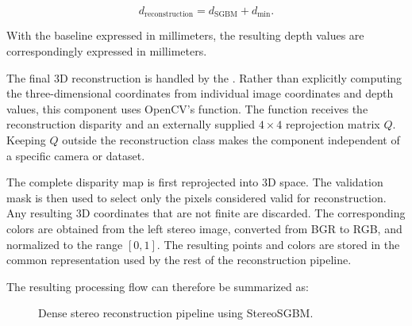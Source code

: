 \begin{equation}
d_{\mathrm{reconstruction}}
=
d_{\mathrm{SGBM}}
+
d_{\min}.
\label{eq:disparity_reconstruction}
\end{equation}

With the baseline expressed in millimeters, the resulting depth values are correspondingly expressed in millimeters.

The final 3D reconstruction is handled by the . Rather than explicitly computing the three-dimensional coordinates from individual image coordinates and depth values, this component uses OpenCV's  function. The function receives the reconstruction disparity and an externally supplied \(4\times4\) reprojection matrix \(Q\). Keeping \(Q\) outside the reconstruction class makes the component independent of a specific camera or dataset.

The complete disparity map is first reprojected into 3D space. The validation mask is then used to select only the pixels considered valid for reconstruction. Any resulting 3D coordinates that are not finite are discarded. The corresponding colors are obtained from the left stereo image, converted from BGR to RGB, and normalized to the range \([0,1]\). The resulting points and colors are stored in the common  representation used by the rest of the reconstruction pipeline.

The resulting processing flow can therefore be summarized as:

\begin{figure}[H]
    \centering
    \caption{Dense stereo reconstruction pipeline using StereoSGBM.}
    \label{fig:sgbm_pipeline}
\end{figure}

